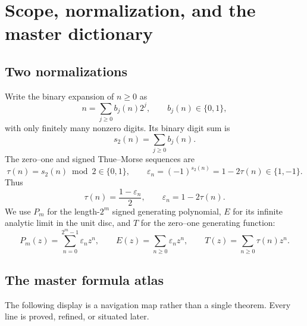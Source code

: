 \documentclass[11pt,oneside]{article}
\theoremstyle{definition}
\theoremstyle{remark}
\newcommand{\bitsum}{s_2}
\newcommand{\eps}{\varepsilon}
\begin{document}
\tableofcontents
\clearpage

\section{Scope, normalization, and the master dictionary}

\subsection{Two normalizations}

Write the binary expansion of $n\ge 0$ as
\[
  n=\sum_{j\ge 0}b_j(n)2^j,
  \qquad b_j(n)\in\{0,1\},
\]
with only finitely many nonzero digits.  Its binary digit sum is
\[
  \bitsum(n)=\sum_{j\ge 0}b_j(n).
\]
The zero--one and signed Thue--Morse sequences are
\begin{equation}\label{eq:two-normalizations}
  \tau(n)=\bitsum(n)\bmod 2\in\{0,1\},
  \qquad
  \eps_n=(-1)^{\bitsum(n)}=1-2\tau(n)\in\{1,-1\}.
\end{equation}
Thus
\begin{equation}\label{eq:tau-eps-conversion}
  \tau(n)=\frac{1-\eps_n}{2},
  \qquad
  \eps_n=1-2\tau(n).
\end{equation}
We use $P_m$ for the length-$2^m$ signed generating polynomial,
$E$ for its infinite analytic limit in the unit disc, and $T$ for the
zero--one generating function:
\begin{equation}\label{eq:master-generating-notation}
  P_m(z)=\sum_{n=0}^{2^m-1}\eps_nz^n,
  \qquad
  E(z)=\sum_{n\ge 0}\eps_nz^n,
  \qquad
  T(z)=\sum_{n\ge 0}\tau(n)z^n.
\end{equation}

\subsection{The master formula atlas}

The following display is a navigation map rather than a single theorem.
Every line is proved, refined, or situated later.
\end{document}
